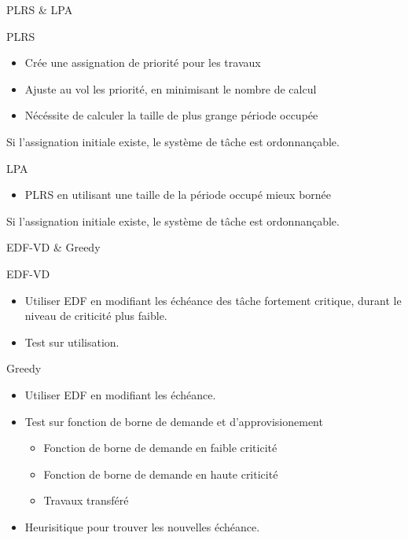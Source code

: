 \documentclass{bredelebeamer}
\begin{document}
\begin{frame}{PLRS \& LPA}

\begin{block}{PLRS}
\begin{itemize}
\item Crée une assignation de priorité pour les travaux
\item Ajuste au vol les priorité, en minimisant le nombre de calcul
\item Nécéssite de calculer la taille de plus grange période occupée
\end{itemize}
Si l'assignation initiale existe, le système de tâche est ordonnançable.
\end{block}

\begin{block}{LPA}
\begin{itemize}
\item PLRS en utilisant une taille de la période occupé mieux bornée
\end{itemize}
Si l'assignation initiale existe, le système de tâche est ordonnançable.
\end{block}

\end{frame}


\begin{frame}{EDF-VD \& Greedy}

\begin{block}{EDF-VD}

\begin{itemize}
\item Utiliser EDF en modifiant les échéance des tâche fortement critique, durant le niveau de criticité plus faible.
\item Test sur utilisation.
\end{itemize}
\end{block}


\begin{block}{Greedy}
\begin{itemize}
\item Utiliser EDF en modifiant les échéance.
\item Test sur fonction de borne de demande et d'approvisionement
\begin{itemize}
\item Fonction de borne de demande en faible criticité
\item Fonction de borne de demande en haute criticité
\item Travaux transféré
\end{itemize}
\item Heurisitique pour trouver les nouvelles échéance.
\end{itemize}
\end{block}

\end{frame}
\end{document}
